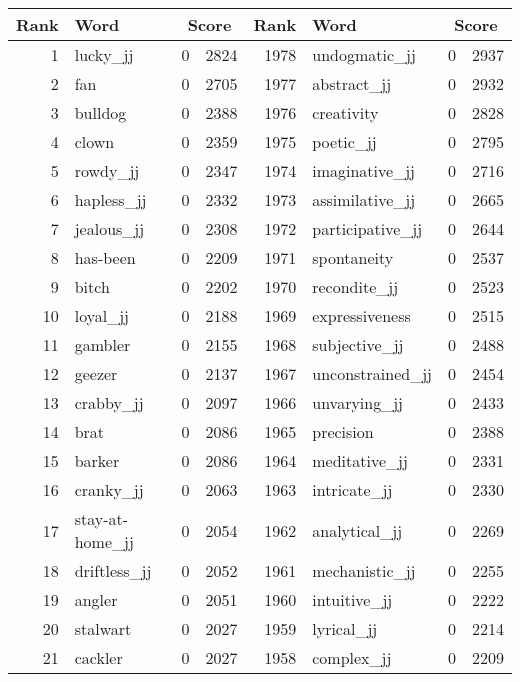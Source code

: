 \begin{table}[tbp]
    \begin{tabular}{| rlr@{.}l | rlr@{.}l |}
    \hline
    \textbf{Rank} & \textbf{Word} & \multicolumn{2}{c|}{\textbf{Score}} & \textbf{Rank} & \textbf{Word} & \multicolumn{2}{c|}{\textbf{Score}} \\
    \hline
    1 & lucky\_jj & 0 & 2824    &    1978 & undogmatic\_jj & 0 & 2937 \\
    2 & fan & 0 & 2705    &    1977 & abstract\_jj & 0 & 2932 \\
    3 & bulldog & 0 & 2388    &    1976 & creativity & 0 & 2828 \\
    4 & clown & 0 & 2359    &    1975 & poetic\_jj & 0 & 2795 \\
    5 & rowdy\_jj & 0 & 2347    &    1974 & imaginative\_jj & 0 & 2716 \\
    6 & hapless\_jj & 0 & 2332    &    1973 & assimilative\_jj & 0 & 2665 \\
    7 & jealous\_jj & 0 & 2308    &    1972 & participative\_jj & 0 & 2644 \\
    8 & has-been & 0 & 2209    &    1971 & spontaneity & 0 & 2537 \\
    9 & bitch & 0 & 2202    &    1970 & recondite\_jj & 0 & 2523 \\
    10 & loyal\_jj & 0 & 2188    &    1969 & expressiveness & 0 & 2515 \\
    11 & gambler & 0 & 2155    &    1968 & subjective\_jj & 0 & 2488 \\
    12 & geezer & 0 & 2137    &    1967 & unconstrained\_jj & 0 & 2454 \\
    13 & crabby\_jj & 0 & 2097    &    1966 & unvarying\_jj & 0 & 2433 \\
    14 & brat & 0 & 2086    &    1965 & precision & 0 & 2388 \\
    15 & barker & 0 & 2086    &    1964 & meditative\_jj & 0 & 2331 \\
    16 & cranky\_jj & 0 & 2063    &    1963 & intricate\_jj & 0 & 2330 \\
    17 & stay-at-home\_jj & 0 & 2054    &    1962 & analytical\_jj & 0 & 2269 \\
    18 & driftless\_jj & 0 & 2052    &    1961 & mechanistic\_jj & 0 & 2255 \\
    19 & angler & 0 & 2051    &    1960 & intuitive\_jj & 0 & 2222 \\
    20 & stalwart & 0 & 2027    &    1959 & lyrical\_jj & 0 & 2214 \\
    21 & cackler & 0 & 2027    &    1958 & complex\_jj & 0 & 2209 \\

\end{tabular}
\end{table}
